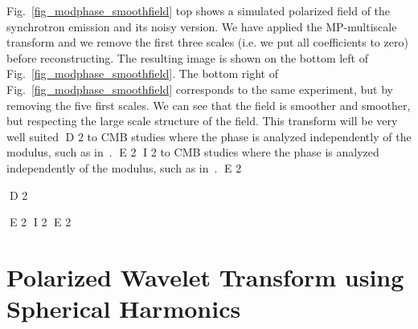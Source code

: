 Fig.~\ref{fig_modphase_smoothfield} top  shows a simulated polarized field of the synchrotron emission and its noisy version.
We have applied the MP-multiscale transform and we remove the first three scales (i.e. we put all coefficients to zero) before 
reconstructing. The resulting image is shown on the bottom left of Fig.~\ref{fig_modphase_smoothfield}. The bottom right of 
Fig.~\ref{fig_modphase_smoothfield} corresponds to the same experiment, but by removing the five first scales. We can see that 
the field is smoother and smoother, but respecting the large scale structure of the field. This transform will be very well suited 
D 2
to CMB studies where the phase is analyzed independently of the modulus, such as in~\cite{coles05,naselsky05}.
E 2
I 2
to CMB studies where the phase is analyzed independently of the modulus, such as in~\citep{coles05,naselsky05}.
E 2


D 2

E 2
I 2
\newpage
E 2
\section{Polarized Wavelet Transform using Spherical Harmonics}
\label{sec:pol_iwt}

